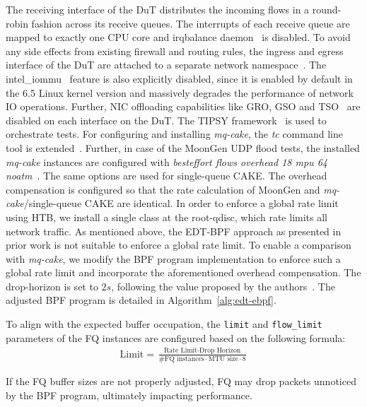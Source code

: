 The receiving interface of the DuT distributes the incoming flows in a round-robin fashion across its receive queues.
%
The interrupts of each receive queue are mapped to exactly one CPU core and irqbalance daemon~\cite{irqbalance} is disabled.
%
To avoid any side effects from existing firewall and routing rules, the ingress and egress interface of the DuT are attached to a separate network namespace~\cite{network-namespace}.
%
The intel\_iommu~\cite{iommu} feature is also explicitly disabled, since it is enabled by default in the 6.5 Linux kernel version and massively degrades the performance of network IO operations.
%
Further, NIC offloading capabilities like GRO, GSO and TSO~\cite{offloads} are disabled on each interface on the DuT.
%
The TIPSY framework~\cite{tipsy} is used to orchestrate tests.
%
For configuring and installing \textit{mq-cake}, the \textit{tc} command line tool is extended~\cite{mq-cake-iproute}.
%
Further, in case of the MoonGen UDP flood tests, the installed \textit{mq-cake} instances are configured with \textit{besteffort flows overhead 18 mpu 64 noatm}~\cite{cake-manual}.
%
The same options are used for single-queue CAKE.
%
The overhead compensation is configured so that the rate calculation of MoonGen and \textit{mq-cake}/single-queue CAKE are identical.
%
In order to enforce a global rate limit using HTB, we install a single class at the root-qdisc, which rate limits all network traffic.
%
As mentioned above, the EDT-BPF approach as presented in prior work is not suitable to enforce a global rate limit.
To enable a comparison with \textit{mq-cake}, we modify the BPF program implementation to enforce such a global rate limit and incorporate the aforementioned overhead compensation.
%
The drop-horizon is set to $2s$, following the value proposed by the authors~\cite{edt-ebpf}. The adjusted BPF program is detailed in Algorithm~\ref{alg:edt-ebpf}.

To align with the expected buffer occupation, the \lstinline{limit} and \lstinline{flow_limit} parameters of the FQ instances are configured based on the following formula:
\begin{align*}
    \text{Limit} = \frac{\text{Rate Limit}\cdot \text{Drop Horizon}}{\text{\# FQ instances}\cdot \text{MTU size} \cdot 8}
\end{align*}

If the FQ buffer sizes are not properly adjusted, FQ may drop packets unnoticed by the BPF program, ultimately impacting performance.

